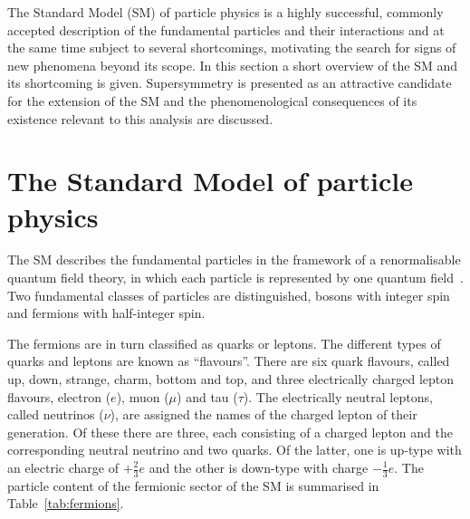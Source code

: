 The Standard Model (SM) of particle physics is a highly successful, commonly accepted description of the fundamental particles and their interactions and at the same time subject to several shortcomings, motivating the search for signs of new phenomena beyond its scope. In this section a short overview of the SM and its shortcoming is given. Supersymmetry is presented as an attractive candidate for the extension of the SM and the phenomenological consequences of its existence relevant to this analysis are discussed. 
\label{sec:theo}
\section{The Standard Model of particle physics}
The SM describes the fundamental particles in the framework of a renormalisable quantum field theory, in which each particle is represented by one quantum field~\cite{Glashow1961579,Salam1964168,PhysRevLett.19.1264,PhysRevD.5.1412}. Two fundamental classes of particles are distinguished, bosons with integer spin and fermions with half-integer spin. 

The fermions are in turn classified as quarks or leptons. The different types of quarks and leptons are known as ``flavours''. There are six quark flavours, called up, down, strange, charm, bottom and top, and three electrically charged lepton flavours, electron ($e$), muon ($\mu$) and tau ($\tau$). The electrically neutral leptons, called neutrinos ($\nu$), are assigned the names of the charged lepton of their generation. Of these there are three, each consisting of a charged lepton and the corresponding neutral neutrino and two quarks. Of the latter, one is up-type with an electric charge of $+\frac{2}{3}e$ and the other is down-type with charge $-\frac{1}{3}e$. The particle content of the fermionic sector of the SM is summarised in Table~\ref{tab:fermions}.

